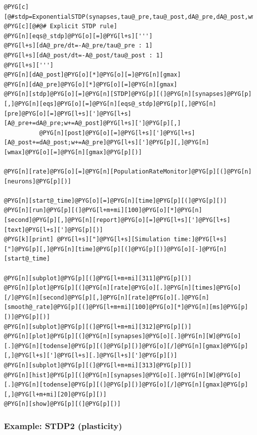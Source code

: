 \documentclass[letterpaper,10pt,english]{manual}
\begin{document}
\begin{Verbatim}[commandchars=@\[\]]
@PYG[c][@#stdp=ExponentialSTDP(synapses,tau@_pre,tau@_post,dA@_pre,dA@_post,wmax=gmax)]
@PYG[c][@#@# Explicit STDP rule]
@PYG[n][eqs@_stdp]@PYG[o][=]@PYG[l+s][''']
@PYG[l+s][dA@_pre/dt=-A@_pre/tau@_pre : 1]
@PYG[l+s][dA@_post/dt=-A@_post/tau@_post : 1]
@PYG[l+s][''']
@PYG[n][dA@_post]@PYG[o][*]@PYG[o][=]@PYG[n][gmax]
@PYG[n][dA@_pre]@PYG[o][*]@PYG[o][=]@PYG[n][gmax]
@PYG[n][stdp]@PYG[o][=]@PYG[n][STDP]@PYG[p][(]@PYG[n][synapses]@PYG[p][,]@PYG[n][eqs]@PYG[o][=]@PYG[n][eqs@_stdp]@PYG[p][,]@PYG[n][pre]@PYG[o][=]@PYG[l+s][']@PYG[l+s][A@_pre+=dA@_pre;w+=A@_post]@PYG[l+s][']@PYG[p][,]
          @PYG[n][post]@PYG[o][=]@PYG[l+s][']@PYG[l+s][A@_post+=dA@_post;w+=A@_pre]@PYG[l+s][']@PYG[p][,]@PYG[n][wmax]@PYG[o][=]@PYG[n][gmax]@PYG[p][)]

@PYG[n][rate]@PYG[o][=]@PYG[n][PopulationRateMonitor]@PYG[p][(]@PYG[n][neurons]@PYG[p][)]

@PYG[n][start@_time]@PYG[o][=]@PYG[n][time]@PYG[p][(]@PYG[p][)]
@PYG[n][run]@PYG[p][(]@PYG[l+m+mi][100]@PYG[o][*]@PYG[n][second]@PYG[p][,]@PYG[n][report]@PYG[o][=]@PYG[l+s][']@PYG[l+s][text]@PYG[l+s][']@PYG[p][)]
@PYG[k][print] @PYG[l+s]["]@PYG[l+s][Simulation time:]@PYG[l+s]["]@PYG[p][,]@PYG[n][time]@PYG[p][(]@PYG[p][)]@PYG[o][-]@PYG[n][start@_time]

@PYG[n][subplot]@PYG[p][(]@PYG[l+m+mi][311]@PYG[p][)]
@PYG[n][plot]@PYG[p][(]@PYG[n][rate]@PYG[o][.]@PYG[n][times]@PYG[o][/]@PYG[n][second]@PYG[p][,]@PYG[n][rate]@PYG[o][.]@PYG[n][smooth@_rate]@PYG[p][(]@PYG[l+m+mi][100]@PYG[o][*]@PYG[n][ms]@PYG[p][)]@PYG[p][)]
@PYG[n][subplot]@PYG[p][(]@PYG[l+m+mi][312]@PYG[p][)]
@PYG[n][plot]@PYG[p][(]@PYG[n][synapses]@PYG[o][.]@PYG[n][W]@PYG[o][.]@PYG[n][todense]@PYG[p][(]@PYG[p][)]@PYG[o][/]@PYG[n][gmax]@PYG[p][,]@PYG[l+s][']@PYG[l+s][.]@PYG[l+s][']@PYG[p][)]
@PYG[n][subplot]@PYG[p][(]@PYG[l+m+mi][313]@PYG[p][)]
@PYG[n][hist]@PYG[p][(]@PYG[n][synapses]@PYG[o][.]@PYG[n][W]@PYG[o][.]@PYG[n][todense]@PYG[p][(]@PYG[p][)]@PYG[o][/]@PYG[n][gmax]@PYG[p][,]@PYG[l+m+mi][20]@PYG[p][)]
@PYG[n][show]@PYG[p][(]@PYG[p][)]
\end{Verbatim}

\resetcurrentobjects
\hypertarget{--doc-examples-plasticity_STDP2}{}

\hypertarget{index-78}{}\subsubsection{Example: STDP2 (plasticity)}
\end{document}
